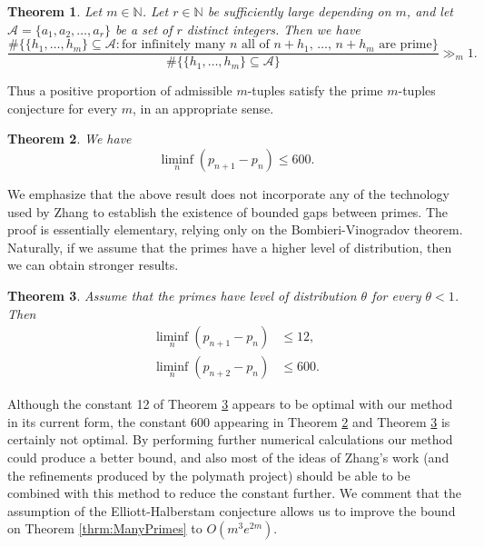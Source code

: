 \documentclass[12pt,a4paper]{amsart}
\theoremstyle{plain}
\newtheorem{thrm}{Theorem}[section]
\numberwithin{sblmm}{thrm}
\numberwithin{equation}{section}
\begin{document}
\begin{thrm}\label{thrm:kTuples}
Let $m\in\mathbb{N}$. Let $r\in\mathbb{N}$ be sufficiently large depending on $m$, and let $\mathcal{A}=\{a_1,a_2,\dotsc,a_r\}$ be a set of $r$ distinct integers. Then we have
\[\frac{\#\{\{h_1,\dotsc,h_m\}\subseteq \mathcal{A}:\text{for infinitely many $n$ all of $n+h_1$, $\dotsc$, $n+h_m$ are prime}\}}{\#\{\{h_1,\dotsc,h_m\}\subseteq \mathcal{A}\}}\gg_m 1.\]
\end{thrm}
Thus a positive proportion of admissible $m$-tuples satisfy the prime $m$-tuples conjecture for every $m$, in an appropriate sense.
\begin{thrm}\label{thrm:Unconditional}We have
\[\liminf_n(p_{n+1}-p_n)\le 600.\]
\end{thrm}
We emphasize that the above result does not incorporate any of the technology used by Zhang to establish the existence of bounded gaps between primes. The proof is essentially elementary, relying only on the Bombieri-Vinogradov theorem. Naturally, if we assume that the primes have a higher level of distribution, then we can obtain stronger results.
\begin{thrm}\label{thrm:EH}
Assume that the primes have level of distribution $\theta$ for every $\theta<1$. Then
\begin{align*}\liminf_n(p_{n+1}-p_n)&\le 12,\\
\liminf_n(p_{n+2}-p_n)&\le 600.\end{align*}
\end{thrm}
Although the constant \num{12} of Theorem \ref{thrm:EH} appears to be optimal with our method in its current form, the constant \num{600} appearing in Theorem \ref{thrm:Unconditional} and Theorem \ref{thrm:EH} is certainly not optimal. By performing further numerical calculations our method could produce a better bound, and also most of the ideas of Zhang's work (and the refinements produced by the polymath project) should be able to be combined with this method to reduce the constant further. We comment that the assumption of the Elliott-Halberstam conjecture allows us to improve the bound on Theorem \ref{thrm:ManyPrimes} to $O(m^3e^{2m})$.

\end{document}
